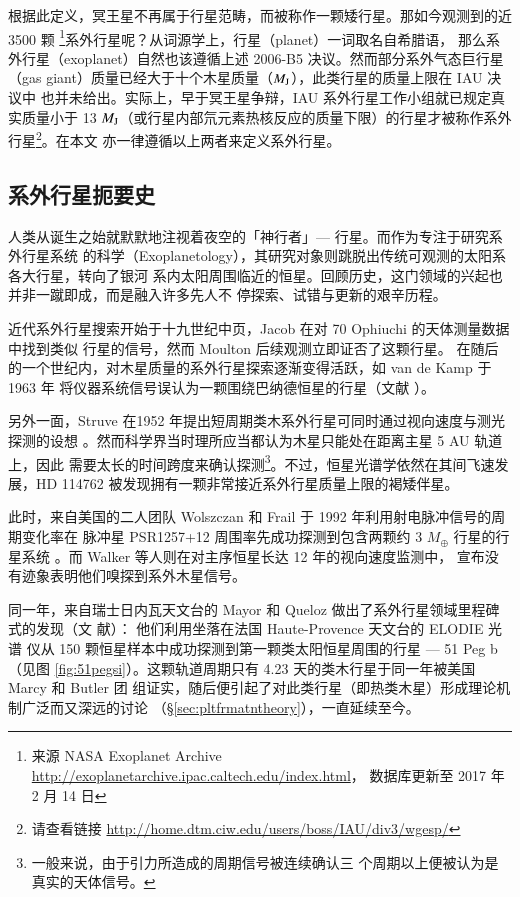 根据此定义，冥王星不再属于行星范畴，而被称作一颗矮行星。那如今观测到的近 3500 颗
\footnote{来源 NASA Exoplanet Archive \url{http://exoplanetarchive.ipac.caltech.edu/index.html}，
数据库更新至 2017 年 2 月 14 日}系外行星呢？从词源学上，行星（planet）一词取名自希腊语，
那么系外行星（exoplanet）自然也该遵循上述 2006-B5 决议。然而部分系外气态巨行星
（gas giant）质量已经大于十个木星质量（$M_\mathrm{J}$），此类行星的质量上限在 IAU 决议中
也并未给出。实际上，早于冥王星争辩，IAU 系外行星工作小组就已规定真实质量小于 13 
$M_\mathrm{J}$（或行星内部氘元素热核反应的质量下限\cite{Baraffe2003}）的行星才被称作系外
行星\footnote{请查看链接 \url{http://home.dtm.ciw.edu/users/boss/IAU/div3/wgesp/}}。在本文
亦一律遵循以上两者来定义系外行星。


\subsection{系外行星扼要史} 

人类从诞生之始就默默地注视着夜空的「神行者」--- 行星。而作为专注于研究系外行星系统
的科学（Exoplanetology），其研究对象则跳脱出传统可观测的太阳系各大行星，转向了银河
系内太阳周围临近的恒星。回顾历史，这门领域的兴起也并非一蹴即成，而是融入许多先人不
停探索、试错与更新的艰辛历程。

近代系外行星搜索开始于十九世纪中页，Jacob 在对 70 Ophiuchi 的天体测量数据中找到类似
行星的信号\cite{Jacob1855}，然而 Moulton 后续观测立即证否了这颗行星\cite{Moulton1899}。
在随后的一个世纪内，对木星质量的系外行星探索逐渐变得活跃，如 van de Kamp 于 1963 年
将仪器系统信号误认为一颗围绕巴纳德恒星的行星（文献 ）。

另外一面，Struve 在1952 年提出短周期类木系外行星可同时通过视向速度与测光探测的设想
\cite{Struve1952}。然而科学界当时理所应当都认为木星只能处在距离主星 5 AU 轨道上，因此
需要太长的时间跨度来确认探测\footnote{一般来说，由于引力所造成的周期信号被连续确认三
个周期以上便被认为是真实的天体信号。}。不过，恒星光谱学依然在其间飞速发展，HD 114762 
被发现拥有一颗非常接近系外行星质量上限的褐矮伴星\cite{Latham1989}。

此时，来自美国的二人团队 Wolszczan 和 Frail 于 1992 年利用射电脉冲信号的周期变化率在
脉冲星 PSR1257+12 周围率先成功探测到包含两颗约 3 $M_\oplus$ 行星的行星系统
\cite{WolszczanFrail1992}。而 Walker 等人则在对主序恒星长达 12 年的视向速度监测中，
宣布没有迹象表明他们嗅探到系外木星信号\cite{Walkeretal1995}。

同一年，来自瑞士日内瓦天文台的 Mayor 和 Queloz 做出了系外行星领域里程碑式的发现（文
献）： 他们利用坐落在法国 Haute-Provence 天文台的 ELODIE 光谱
仪从 150 颗恒星样本中成功探测到第一颗类太阳恒星周围的行星  --- 51 Peg b（见图 
\ref{fig:51pegsi}）。这颗轨道周期只有 4.23 天的类木行星于同一年被美国 Marcy 和 Butler 团
组证实，随后便引起了对此类行星（即热类木星）形成理论机制广泛而又深远的讨论
（\S \ref{sec:pltfrmatntheory}），一直延续至今。

